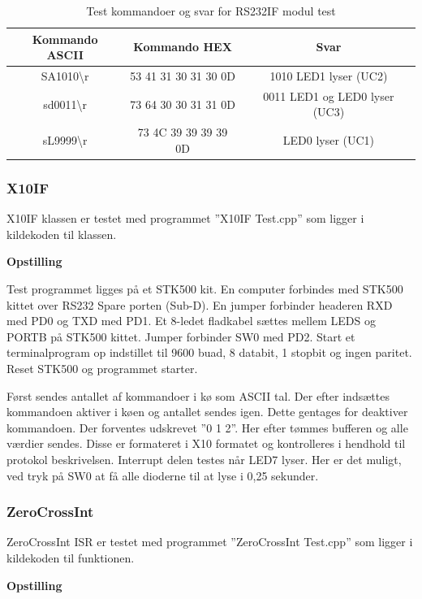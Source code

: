 \begin{table}[h]
	\caption{Test kommandoer og svar for RS232IF modul test}
	\centering
	\begin{tabular}{|c|c|c|}
		\hline 
		\textbf{Kommando ASCII} & \textbf{Kommando HEX} & \textbf{Svar} \\ 
		\hline 
		SA1010\textbackslash r & 53 41 31 30 31 30 0D & 1010 LED1 lyser (UC2) \\ 
		\hline 
		sd0011\textbackslash r & 73 64 30 30 31 31 0D & 0011 LED1 og LED0 lyser (UC3) \\ 
		\hline 
		sL9999\textbackslash r & 73 4C 39 39 39 39 0D & LED0 lyser (UC1) \\ 
		\hline 
	\end{tabular} 
	\label{table:Test_RS232IF_kommandoer}
\end{table}

\subsubsection{X10IF}
X10IF klassen er testet med programmet ''X10IF Test.cpp'' som ligger i kildekoden til klassen.

\textbf{Opstilling}

Test programmet ligges på et STK500 kit.
En computer forbindes med STK500 kittet over RS232 Spare porten (Sub-D).
En jumper forbinder headeren RXD med PD0 og TXD med PD1. Et 8-ledet fladkabel sættes mellem LEDS og PORTB på STK500 kittet. Jumper forbinder SW0 med PD2.
Start et terminalprogram op indstillet til 9600 buad, 8 databit, 1 stopbit og ingen paritet.
Reset STK500 og programmet starter.

Først sendes antallet af kommandoer i kø som ASCII tal. Der efter indsættes kommandoen aktiver i køen og antallet sendes igen. Dette gentages for deaktiver kommandoen. Der forventes udskrevet ''0 1 2''.
Her efter tømmes bufferen og alle værdier sendes. Disse er formateret i X10 formatet og kontrolleres i hendhold til protokol beskrivelsen.
Interrupt delen testes når LED7 lyser. Her er det muligt, ved tryk på SW0 at få alle dioderne til at lyse i 0,25 sekunder.
 
\subsubsection{ZeroCrossInt}
ZeroCrossInt ISR er testet med programmet ''ZeroCrossInt Test.cpp'' som ligger i kildekoden til funktionen.

\textbf{Opstilling}


